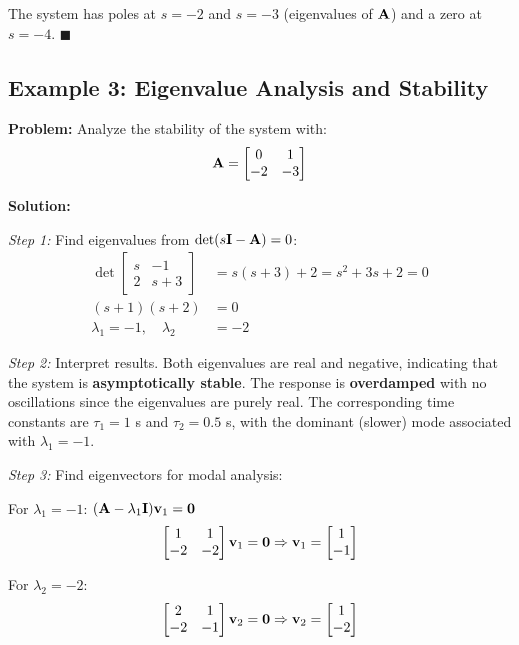 The system has poles at $s=-2$ and $s=-3$ (eigenvalues of $\mathbf{A}$) and a zero at $s=-4$.
\hfill $\blacksquare$

\subsection{Example 3: Eigenvalue Analysis and Stability}

\textbf{Problem:} Analyze the stability of the system with:
\begin{equation}
    \mathbf{A} = \begin{bmatrix} 0 & 1 \\ -2 & -3 \end{bmatrix}
\end{equation}

\textbf{Solution:}

\textit{Step 1:} Find eigenvalues from $\det(s\mathbf{I} - \mathbf{A}) = 0$:
\begin{align}
    \det\begin{bmatrix} s & -1 \\ 2 & s+3 \end{bmatrix} &= s(s+3) + 2 = s^2 + 3s + 2 = 0 \\
    (s+1)(s+2) &= 0 \\
    \lambda_1 = -1, \quad \lambda_2 &= -2
\end{align}

\textit{Step 2:} Interpret results. Both eigenvalues are real and negative, indicating that the system is \textbf{asymptotically stable}. The response is \textbf{overdamped} with no oscillations since the eigenvalues are purely real. The corresponding time constants are $\tau_1 = 1$ s and $\tau_2 = 0.5$ s, with the dominant (slower) mode associated with $\lambda_1 = -1$.

\textit{Step 3:} Find eigenvectors for modal analysis:

For $\lambda_1 = -1$: $(\mathbf{A} - \lambda_1\mathbf{I})\mathbf{v}_1 = \mathbf{0}$
\begin{equation}
    \begin{bmatrix} 1 & 1 \\ -2 & -2 \end{bmatrix}\mathbf{v}_1 = \mathbf{0} \Rightarrow
    \mathbf{v}_1 = \begin{bmatrix} 1 \\ -1 \end{bmatrix}
\end{equation}

For $\lambda_2 = -2$:
\begin{equation}
    \begin{bmatrix} 2 & 1 \\ -2 & -1 \end{bmatrix}\mathbf{v}_2 = \mathbf{0} \Rightarrow
    \mathbf{v}_2 = \begin{bmatrix} 1 \\ -2 \end{bmatrix}
\end{equation}

